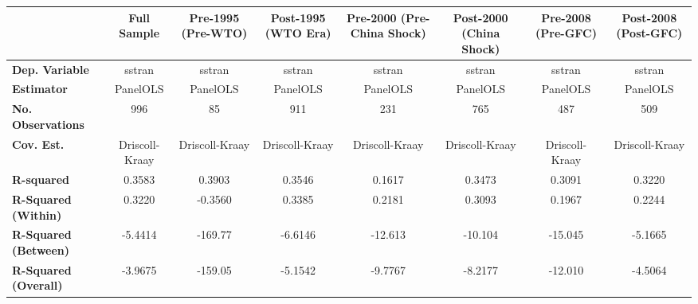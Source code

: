 \begin{center}
\begin{tabular}{lccccccc}
\toprule
                                   & \textbf{Full Sample} & \textbf{Pre-1995 (Pre-WTO)} & \textbf{Post-1995 (WTO Era)} & \textbf{Pre-2000 (Pre-China Shock)} & \textbf{Post-2000 (China Shock)} & \textbf{Pre-2008 (Pre-GFC)} & \textbf{Post-2008 (Post-GFC)}  \\
\midrule
\textbf{Dep. Variable}             &        sstran        &            sstran           &            sstran            &                sstran               &              sstran              &            sstran           &             sstran             \\
\textbf{Estimator}                 &       PanelOLS       &           PanelOLS          &           PanelOLS           &               PanelOLS              &             PanelOLS             &           PanelOLS          &            PanelOLS            \\
\textbf{No. Observations}          &         996          &              85             &             911              &                 231                 &               765                &             487             &              509               \\
\textbf{Cov. Est.}                 &    Driscoll-Kraay    &        Driscoll-Kraay       &        Driscoll-Kraay        &            Driscoll-Kraay           &          Driscoll-Kraay          &        Driscoll-Kraay       &         Driscoll-Kraay         \\
\textbf{R-squared}                 &        0.3583        &            0.3903           &            0.3546            &                0.1617               &              0.3473              &            0.3091           &             0.3220             \\
\textbf{R-Squared (Within)}        &        0.3220        &           -0.3560           &            0.3385            &                0.2181               &              0.3093              &            0.1967           &             0.2244             \\
\textbf{R-Squared (Between)}       &       -5.4414        &           -169.77           &           -6.6146            &               -12.613               &             -10.104              &           -15.045           &            -5.1665             \\
\textbf{R-Squared (Overall)}       &       -3.9675        &           -159.05           &           -5.1542            &               -9.7767               &             -8.2177              &           -12.010           &            -4.5064             \\

\end{tabular}
\end{center}
